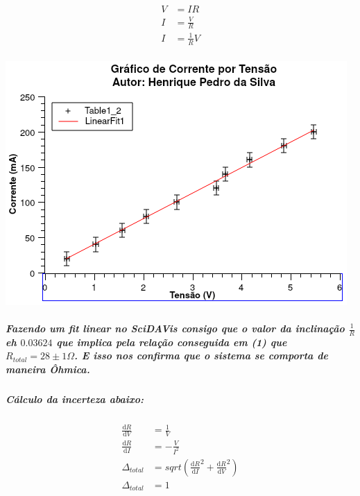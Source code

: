 \documentclass[12pt,twoside, a4paper, twocolumn]{article}
\newcommand\deriv[2]{\frac{\mathrm d #1}{\mathrm d #2}}
\begin{document}
\begin{equation}
    \begin{aligned}
        V & = I R           \\
        I & = \frac{V}{R}   \\
        I & = \frac{1}{R} V \\
    \end{aligned}
\end{equation}
\begin{adjustbox}{scale=0.70}
    \includegraphics{Graph1.png}
\end{adjustbox}

\subparagraph*{Fazendo um fit linear no SciDAVis consigo que o valor da inclinação $\frac{1}{R}$ eh $0.03624$  que implica pela relação conseguida em (1) que $ R_{total} = 28 \pm 1 \varOmega$. E isso nos confirma que o sistema se comporta de maneira Ôhmica.}

\subparagraph*{Cálculo da incerteza abaixo:}

\begin{equation}
    \begin{aligned}
        \deriv{R}{V}      & = \frac{1}{V}                                          \\
        \deriv{R}{I}      & = - \frac{V}{I^2}                                      \\
        \varDelta_{total} & = sqrt{\left( \deriv{R}{I}^2 + \deriv{R}{V}^2 \right)} \\
        \varDelta_{total} & = 1                                                    \\
    \end{aligned}
\end{equation}
\end{document}
